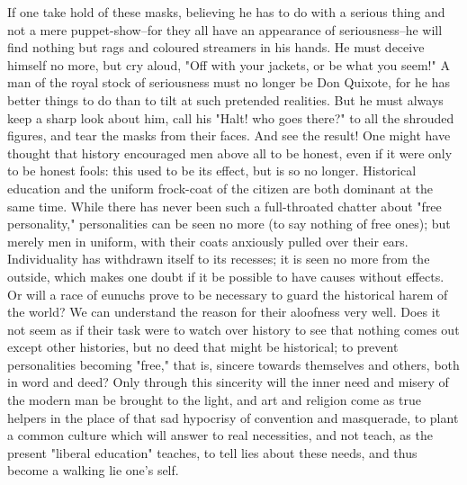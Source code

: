 If one take hold of these masks, believing he has to do with a
serious thing and not a mere puppet-show--for they all have an
appearance of seriousness--he will find nothing but rags and coloured
streamers in his hands. He must deceive himself no more, but cry
aloud, "Off with your jackets, or be what you seem!" A man of the
royal stock of seriousness must no longer be Don Quixote, for he has
better things to do than to tilt at such pretended realities. But he
must always keep a sharp look about him, call his "Halt! who goes
there?" to all the shrouded figures, and tear the masks from their
faces. And see the result! One might have thought that history
encouraged men above all to be honest, even if it were only to be
honest fools: this used to be its effect, but is so no longer.
Historical education and the uniform frock-coat of the citizen are
both dominant at the same time. While there has never been such a
full-throated chatter about "free personality," personalities can be
seen no more (to say nothing of free ones); but merely men in
uniform, with their coats anxiously pulled over their ears.
Individuality has withdrawn itself to its recesses; it is seen no
more from the outside, which makes one doubt if it be possible to
have causes without effects. Or will a race of eunuchs prove to be
necessary to guard the historical harem of the world? We can
understand the reason for their aloofness very well. Does it not seem
as if their task were to watch over history to see that nothing comes
out except other histories, but no deed that might be historical; to
prevent personalities becoming "free," that is, sincere towards
themselves and others, both in word and deed? Only through this
sincerity will the inner need and misery of the modern man be brought
to the light, and art and religion come as true helpers in the place
of that sad hypocrisy of convention and masquerade, to plant a common
culture which will answer to real necessities, and not teach, as the
present "liberal education" teaches, to tell lies about these needs,
and thus become a walking lie one's self.

